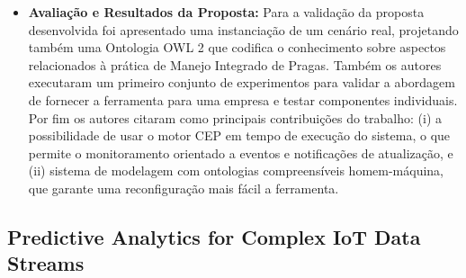 \documentclass[tid,table]{texufpel} %
\begin{document}
\begin{itemize}
	
	\item \textbf{Avaliação e Resultados da Proposta:} Para a validação da proposta desenvolvida foi apresentado uma instanciação de um cenário real, projetando também uma Ontologia OWL 2 que codifica o conhecimento sobre aspectos relacionados à prática de Manejo Integrado de Pragas. Também os autores executaram um primeiro conjunto de experimentos para validar a abordagem de fornecer a ferramenta para uma empresa e testar componentes individuais. Por fim os autores citaram como principais contribuições do trabalho: (i) a possibilidade de usar o motor CEP em tempo de execução do sistema, o que permite o monitoramento orientado a eventos e notificações de atualização, e (ii) sistema de modelagem com ontologias compreensíveis homem-máquina, que garante uma reconfiguração mais fácil a ferramenta. 
	
\end{itemize}

\subsection{Predictive Analytics for Complex IoT Data Streams}
\end{document}
